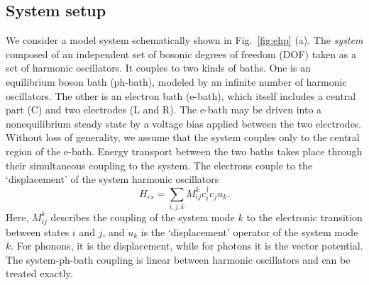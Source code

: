 \documentclass[aps,prb,
,floatfix,footinbib,shortbibliography,
preprint
]{revtex4-1}
\begin{document}
\subsection{System setup}
We consider a model system schematically shown in Fig.~\ref{fig:ehp} (a). The \emph{system} composed of an independent set of bosonic degrees of freedom (DOF) taken as a set of harmonic oscillators. It couples to two kinds of baths. One is an equilibrium boson bath (ph-bath), modeled by an infinite number of harmonic oscillators. The other is an electron bath (e-bath), which itself includes a central part (C) and two electrodes (L and R).  The e-bath may be driven into a nonequilibrium steady state by a voltage bias applied between the two electrodes. Without loss of generality, we assume that the system couples only to the central region of the e-bath. Energy transport between the two baths takes place through their simultaneous coupling to the system. 
The electrons couple to the `displacement' of the system harmonic oscillators
\begin{equation}
H_{es} = \sum_{i,j,k} M^{k}_{ij}c^\dagger_i c_j u_k.
\label{eq:eboson}
\end{equation}
Here, $M^k_{ij}$ describes the coupling of the system mode $k$ to the electronic transition between states $i$ and $j$, and $u_k$ is the `displacement' operator of the system mode $k$. For phonons, it is the displacement, while for photons it is the vector potential. The system-ph-bath coupling is linear between harmonic oscillators and can be treated exactly.



\end{document}
